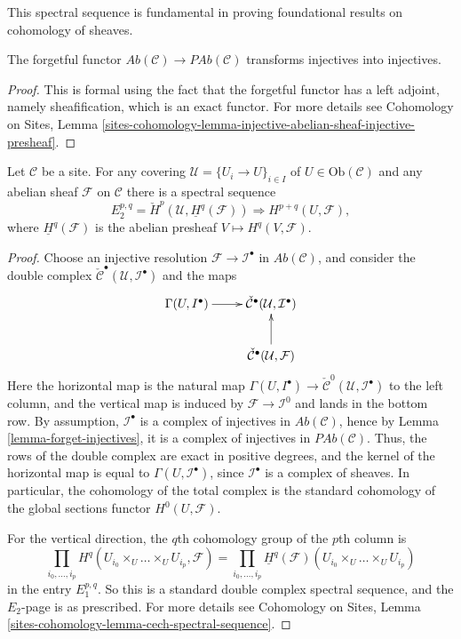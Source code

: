 \noindent
This spectral sequence is fundamental in proving foundational results on
cohomology of sheaves.

\begin{lemma}
\label{lemma-forget-injectives}
The forgetful functor $\textit{Ab}(\mathcal{C})\to \textit{PAb}(\mathcal{C})$
transforms injectives into injectives.
\end{lemma}

\begin{proof}
This is formal using the fact that the forgetful functor has a left adjoint,
namely sheafification, which is an exact functor. For more details see
Cohomology on Sites,
Lemma \ref{sites-cohomology-lemma-injective-abelian-sheaf-injective-presheaf}.
\end{proof}

\begin{theorem}
\label{theorem-cech-ss}
Let $\mathcal{C}$ be a site. For any covering
$\mathcal{U} = \{U_i \to U\}_{i \in I}$ of $U \in \text{Ob}(\mathcal{C})$
and any abelian sheaf $\mathcal{F}$ on $\mathcal{C}$
there is a spectral sequence
$$
E_2^{p, q}
=
\check H^p(\mathcal{U}, \underline{H}^q(\mathcal{F}))
\Rightarrow
H^{p+q}(U, \mathcal{F}),
$$
where $\underline{H}^q(\mathcal{F})$ is the abelian presheaf
$V \mapsto H^q(V, \mathcal{F})$.
\end{theorem}

\begin{proof}
Choose an injective resolution $\mathcal{F}\to \mathcal{I}^\bullet$ in
$\textit{Ab}(\mathcal{C})$, and consider the double complex
$\check{\mathcal{C}}^\bullet(\mathcal{U}, \mathcal{I}^\bullet)$
and the maps
$$
\xymatrix{
\Gamma(U, I^\bullet) \ar[r] &
\check{\mathcal{C}}^\bullet(\mathcal{U}, \mathcal{I}^\bullet) \\
& \check{\mathcal{C}}^\bullet(\mathcal{U}, \mathcal{F}) \ar[u]
}
$$
Here the horizontal map is the natural map
$\Gamma(U, I^\bullet) \to
\check{\mathcal{C}}^0(\mathcal{U}, \mathcal{I}^\bullet)$
to the left column, and the vertical map is induced by
$\mathcal{F}\to \mathcal{I}^0$ and lands in the bottom row.
By assumption, $\mathcal{I}^\bullet$ is a complex of injectives in
$\textit{Ab}(\mathcal{C})$, hence by
Lemma \ref{lemma-forget-injectives}, it is a complex of injectives in
$\textit{PAb}(\mathcal{C})$. Thus, the rows of the double complex are exact in
positive degrees, and the kernel of the horizontal map is equal to
$\Gamma(U, \mathcal{I}^\bullet)$, since $\mathcal{I}^\bullet$
is a complex of sheaves. In particular, the cohomology of the total complex
is the standard
cohomology of the global sections functor $H^0(U, \mathcal{F})$.

\medskip\noindent
For the vertical direction, the $q$th cohomology group of the $p$th column is
$$
\prod_{i_0, \ldots, i_p}
H^q(U_{i_0} \times_U \ldots \times_U U_{i_p}, \mathcal{F})
=
\prod_{i_0, \dots, i_p}
\underline{H}^q(\mathcal{F})(U_{i_0}\times_U \ldots \times_U U_{i_p})
$$
in the entry $E_1^{p,q}$. So this is a standard double complex spectral
sequence, and the $E_2$-page is as prescribed. For more details see
Cohomology on Sites,
Lemma \ref{sites-cohomology-lemma-cech-spectral-sequence}.
\end{proof}

